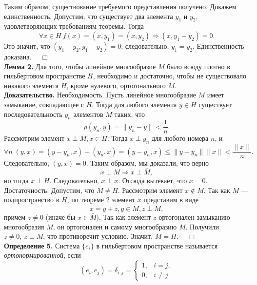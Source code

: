 \documentclass[12pt,a4paper, titlepage]{article}
\begin{document}
Таким образом, существование требуемого представления получено. Докажем единственность. Допустим, что существует два элемента $y_1$ и $y_2$, удовлетворяющих требованиям теоремы. Тогда 
$$
\forall x \in H\ f(x) = (x, y_1) = (x, y_2) \Rightarrow (x, y_1 - y_2) = 0.
$$
Это значит, что $(y_1 - y_2, y_1 - y_2) = 0$; следовательно, $y_1 = y_2$. Единственность доказана. $\quad \Box$\\

\textbf{Лемма 2.} Для того, чтобы линейное многообразие $M$ было всюду плотно в гильбертовом пространстве $H$, необходимо и достаточно, чтобы не существовало никакого элемента $H$, кроме нулевого, ортогонального $M$.\\
\textbf{Доказательство.} Необходимость. Пусть линейное многообразие $M$ имеет замыкание, совпадающее с $H$. Тогда для любого элемента $y \in H$ существует последовательность ${y_n}$ элементов $M$ таких, что 
$$
\rho (y_n, y) = \|y_n - y\| < \frac{1}{n}.
$$
Рассмотрим элемент $x \perp M, x \in H$. Тогда $x \perp y_n$ для любого номера $n$, и
$$
\forall n \; (y, x) = (y - y_n, x) + (y_n, x) = (y - y_n, x) \leqslant \|y - y_n\|\|x\| < \frac{\|x\|}{n}. 
$$
Следовательно, $(y, x) = 0$. Таким образом, мы доказали, что верно 
$$
x \perp M \Rightarrow x \perp \overline{M},
$$
но тогда $x \perp H$. Следовательно, $x \perp x$. Отсюда вытекает, что $x = 0$.\\

Достаточность. Допустим, что $\overline{M} \neq H$. Рассмотрим элемент $x \notin \overline{M}$. Так как $\overline{M}$ --- подпространство в $H$, по теореме 2 элемент $x$ представим в виде
$$
x = y + z, y \in \overline{M}, z \perp \overline{M},
$$
причем $z \neq 0$ (иначе бы $x \in \overline{M}$). Так как элемент $z$ ортогонален замыканию многообразия $M$, он ортогонален и самому многообразию $M$. Получили $z \neq 0, \ z \perp M$, что противоречит условию. Значит, $\overline{M} = H$. $\quad \Box$\\

\textbf{Определение 5.} Система $\{e_i\}$ в гильбертовом пространстве называется \textit{ортонормированной}, если
$$
(e_i, e_j) = \delta_{i,j} =\begin{cases}
1, & i = j, \\
0, & i \neq j.
\end{cases}
$$
\end{document}
